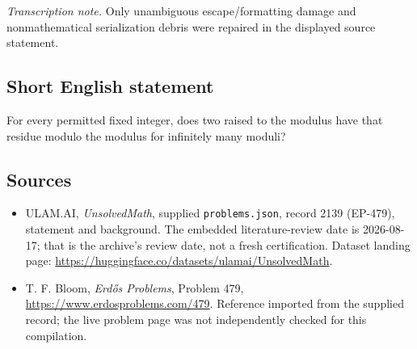 \documentclass[11pt,a4paper]{article}
\begin{document}
{\small\emph{Transcription note.} Only unambiguous escape/formatting damage and nonmathematical serialization debris were repaired in the displayed source statement.}

\subsection{Short English statement}

For every permitted fixed integer, does two raised to the modulus have that residue modulo the modulus for infinitely many moduli?

\subsection{Sources}

{\small

\begin{itemize}

\item[\hypertarget{source:2139:1}{S1}] ULAM.AI, \emph{UnsolvedMath}, supplied \texttt{problems.json}, record 2139 (EP-479), statement and background. The embedded literature-review date is 2026-08-17; that is the archive’s review date, not a fresh certification. Dataset landing page: \url{https://huggingface.co/datasets/ulamai/UnsolvedMath}.

\item[\hypertarget{source:2139:2}{S2}] T. F. Bloom, \emph{Erdős Problems}, Problem 479, \url{https://www.erdosproblems.com/479}. Reference imported from the supplied record; the live problem page was not independently checked for this compilation.

\end{itemize}

}

\label{end:2139}
\end{document}
